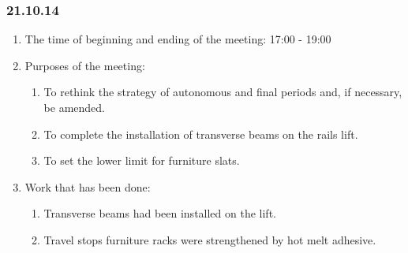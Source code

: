 	
\subsubsection{21.10.14}

\begin{enumerate}
	\item The time of beginning and ending of the meeting:
	17:00 - 19:00
	\item Purposes of the meeting:
	\begin{enumerate}
	  \item To rethink the strategy of autonomous and final periods and, if necessary, be amended.
	  
	  \item To complete the installation of transverse beams on the rails lift.
	  
	  \item To set the lower limit for furniture slats.
	  
    \end{enumerate}
    
	\item Work that has been done:
	\begin{enumerate}
	  \item Transverse beams had been installed on the lift.
      
      \item Travel stops furniture racks were strengthened by hot melt adhesive.
      

\end{enumerate}
\end{enumerate}
